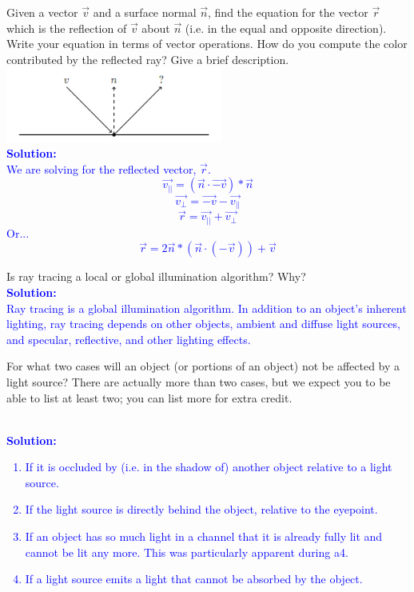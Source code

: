 \documentclass[10pt,twocolumn]{article}
\newcommand{\solution}[1]{\textcolor{Blue}{\\{\bf Solution:} \\ #1}}  %
\begin{document}
\begin{framed}
\noindent{\bf[2 points]} Given a vector $\vec{v}$ and a surface normal $\vec{n}$, find the equation for the vector $\vec{r}$ which is the reflection of $\vec{v}$ about $\vec{n}$ (i.e. in the equal and opposite direction). Write your equation in terms of vector operations. How do you compute the color contributed by the reflected ray? Give a brief description.
\includegraphics[width=2.8in]{reflection.png}
\solution{
We are solving for the reflected vector, $\vec{r}$.
\[ \vec{v_{||}} = (\vec{n} \cdot \vec{-v}) * \vec{n}\]
\[ \vec{v_{\perp}} = \vec{-v} - \vec{v_{||}} \]
\[ \vec{r} = \vec{v_{||}} + \vec{v_{\perp}} \]
Or...
\[ \vec{r} = 2\vec{n} * (\vec{n} \cdot (-\vec{v})) + \vec{v} \]
}
\end{framed}

\begin{framed}
\pagebreak
\noindent{\bf[1 point]} Is ray tracing a local or global illumination algorithm? Why?
\solution{
Ray tracing is a global illumination algorithm. In addition to an object's inherent lighting, ray tracing depends on other objects, ambient and diffuse light sources, and specular, reflective, and other lighting effects.
}
\end{framed}

\begin{framed}
\noindent{\bf[1 point]} For what two cases will an object (or portions of an object) not be affected by a light source? There are actually more than two cases, but we expect you to be able to list at least two; you can list more for extra credit.
\solution{
\begin{enumerate}
\item If it is occluded by (i.e. in the shadow of) another object relative to a light source.
\item If the light source is directly behind the object, relative to the eyepoint.
\item If an object has so much light in a channel that it is already fully lit and cannot be lit any more. This was particularly apparent during a4.
\item If a light source emits a light that cannot be absorbed by the object.
\end{enumerate}
}
\end{framed}
\end{document}
